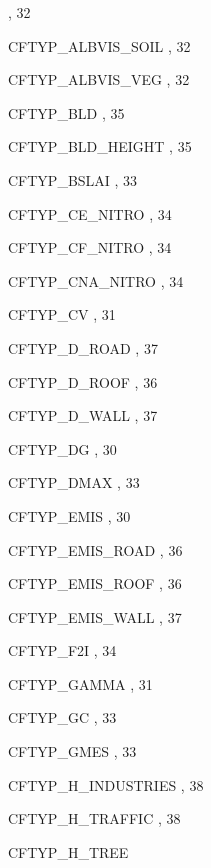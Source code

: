 \begin{theindex}
    \subitem {},  32
  \item CFTYP\_ALBVIS\_SOIL
    \subitem {},  32
  \item CFTYP\_ALBVIS\_VEG
    \subitem {},  32
  \item CFTYP\_BLD
    \subitem {},  35
  \item CFTYP\_BLD\_HEIGHT
    \subitem {},  35
  \item CFTYP\_BSLAI
    \subitem {},  33
  \item CFTYP\_CE\_NITRO
    \subitem {},  34
  \item CFTYP\_CF\_NITRO
    \subitem {},  34
  \item CFTYP\_CNA\_NITRO
    \subitem {},  34
  \item CFTYP\_CV
    \subitem {},  31
  \item CFTYP\_D\_ROAD
    \subitem {},  37
  \item CFTYP\_D\_ROOF
    \subitem {},  36
  \item CFTYP\_D\_WALL
    \subitem {},  37
  \item CFTYP\_DG
    \subitem {},  30
  \item CFTYP\_DMAX
    \subitem {},  33
  \item CFTYP\_EMIS
    \subitem {},  30
  \item CFTYP\_EMIS\_ROAD
    \subitem {},  36
  \item CFTYP\_EMIS\_ROOF
    \subitem {},  36
  \item CFTYP\_EMIS\_WALL
    \subitem {},  37
  \item CFTYP\_F2I
    \subitem {},  34
  \item CFTYP\_GAMMA
    \subitem {},  31
  \item CFTYP\_GC
    \subitem {},  33
  \item CFTYP\_GMES
    \subitem {},  33
  \item CFTYP\_H\_INDUSTRIES
    \subitem {},  38
  \item CFTYP\_H\_TRAFFIC
    \subitem {},  38
  \item CFTYP\_H\_TREE

\end{theindex}
